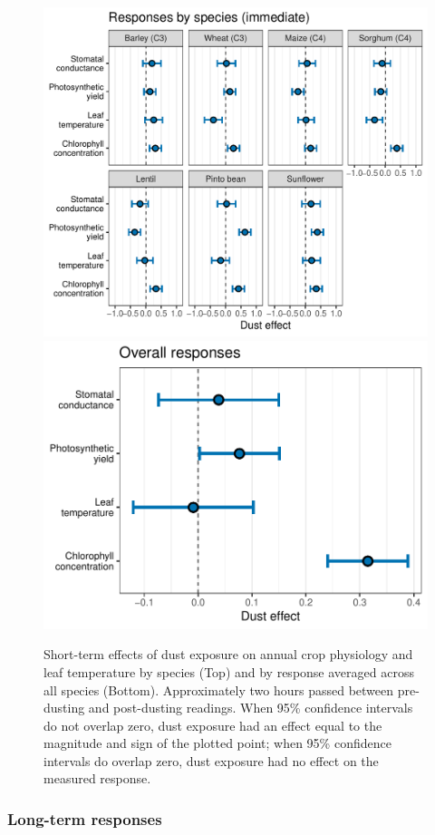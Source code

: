 \documentclass{svjour3}
\begin{document}
\begin{figure}
	 \hspace{0.5em}\includegraphics[width=0.8\linewidth]{figures/st_spp_gg-1}
	\includegraphics[width=0.75\linewidth]{figures/st_ov_gg-1}
	\caption{Short-term effects of dust exposure on annual crop physiology and leaf temperature by species (Top) and by response averaged across all species (Bottom).
		Approximately two hours passed between pre-dusting and post-dusting readings. 
		When 95\% confidence intervals do not overlap zero, dust exposure had an effect equal to the magnitude and sign of the plotted point; when 95\% confidence intervals do overlap zero, dust exposure had no effect on the measured response. \label{fig:st_cropCIs} }
\end{figure}

\subsubsection{Long-term responses}
\end{document}
